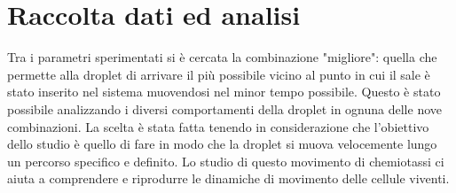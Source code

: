 \chapter{Raccolta dati ed analisi}
\vspace{0.5cm}
\label{cha:789}

Tra i parametri sperimentati si è cercata la combinazione "migliore": quella che permette alla droplet di arrivare il più possibile vicino al punto in cui il sale è stato inserito nel sistema muovendosi nel minor tempo possibile. Questo è stato possibile analizzando i diversi comportamenti della droplet in ognuna delle nove combinazioni. La scelta è stata fatta tenendo in considerazione che l'obiettivo dello studio è quello di fare in modo che la droplet si muova velocemente lungo un percorso specifico e definito. Lo studio di questo movimento di chemiotassi ci aiuta a comprendere e riprodurre le dinamiche di movimento delle cellule viventi. 

